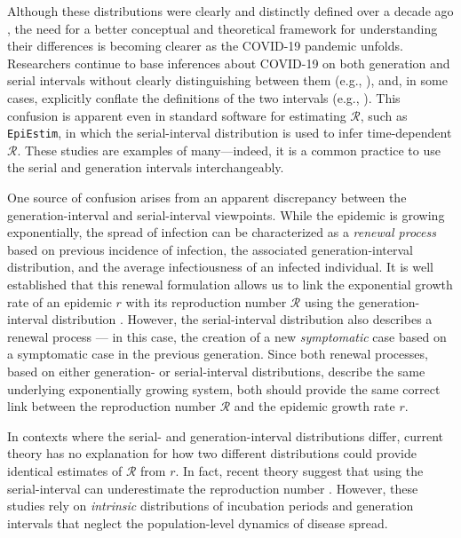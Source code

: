 \documentclass[12pt]{article}
\newcommand{\RR}{\ensuremath{{\mathcal R}}\xspace}
\begin{document}
Although these distributions were clearly and distinctly defined over a decade ago \citep{svensson2007note}, 
the need for a better conceptual and theoretical framework for understanding their differences is becoming clearer as the COVID-19 pandemic unfolds.
Researchers continue to base inferences about COVID-19 on both generation and serial intervals without clearly distinguishing between them (e.g., \cite{tempvar,du2020serial,he2020temporal,wu2020nowcasting,zhao2020serial}), and, in some cases, explicitly conflate the definitions of the two intervals (e.g., \cite{anderson2020will,hellewell2020feasibility}).
This confusion is apparent even in standard software for estimating \RR, such as \texttt{EpiEstim}, in which the serial-interval distribution is used to infer time-dependent \RR \citep{thompson2019improved}.
These studies are examples of many---indeed, it is a common practice to use the serial and generation intervals interchangeably.

One source of confusion arises from an apparent discrepancy between the generation-interval and serial-interval viewpoints.
While the epidemic is growing exponentially, the spread of infection can be characterized as a \emph{renewal process} based on previous incidence of infection, the associated generation-interval distribution, and the average infectiousness of an infected individual.
It is well established that this renewal formulation allows us to link the exponential growth rate of an epidemic $r$ with its reproduction number \RR using the generation-interval distribution \citep{wallinga2007generation}.
However, the serial-interval distribution also describes a renewal process --- in this case, the creation of a new \emph{symptomatic} case based on a symptomatic case in the previous generation.
Since both renewal processes, based on either generation- or serial-interval distributions, describe the same underlying exponentially growing system, both should provide the same correct link between the reproduction number \RR and the epidemic growth rate $r$.

In contexts where the serial- and generation-interval distributions differ, current theory has no explanation for how two different distributions could provide identical estimates of \RR from $r$. 
In fact, recent theory suggest that using the serial-interval can underestimate the reproduction number \citep{britton2019estimation, ganyani2020estimating}.
However, these studies rely on \emph{intrinsic} distributions of incubation periods and generation intervals that neglect the population-level dynamics of disease spread.
\end{document}

